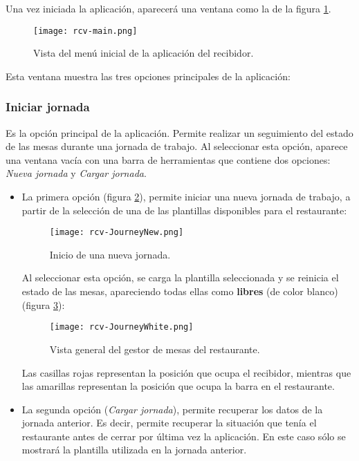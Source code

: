 Una vez iniciada la aplicación, aparecerá una ventana como la de la
figura \ref{fig:rcv-main}.

  \begin{figure}[ht]
    \begin{center}
      \texttt{[image: rcv-main.png]}
      \caption{Vista del menú inicial de la aplicación del recibidor.}
      \label{fig:rcv-main}
    \end{center}
  \end{figure}

Esta ventana muestra las tres opciones principales de la aplicación:

\subsubsection{Iniciar jornada}
Es la opción principal de la aplicación. Permite realizar un seguimiento del
estado de las mesas durante una jornada de trabajo. Al seleccionar esta
opción, aparece una ventana vacía con una barra de herramientas que contiene
dos opciones: \emph{Nueva jornada} y \emph{Cargar jornada}.

\begin{itemize}
\item La primera opción (figura \ref{fig:rcv-JourneyNew}), permite iniciar una
nueva jornada de trabajo, a partir de la selección de una de las plantillas
disponibles para el restaurante:

  \begin{figure}[h]
    \begin{center}
      \texttt{[image: rcv-JourneyNew.png]}
      \caption{Inicio de una nueva jornada.}
      \label{fig:rcv-JourneyNew}
    \end{center}
  \end{figure}

Al seleccionar esta opción, se carga la plantilla seleccionada y se reinicia
el estado de las mesas, apareciendo todas ellas como \textbf{libres} (de
color blanco) (figura \ref{fig:rcv-JourneyWhite}):

  \begin{figure}[ht]
    \begin{center}
      \texttt{[image: rcv-JourneyWhite.png]}
      \caption{Vista general del gestor de mesas del restaurante.}
      \label{fig:rcv-JourneyWhite}
    \end{center}
  \end{figure}

Las casillas rojas representan la posición que ocupa el recibidor, mientras
que las amarillas representan la posición que ocupa la barra en el restaurante.

\item La segunda opción (\emph{Cargar jornada}), permite recuperar los datos
de la jornada anterior. Es decir, permite recuperar la situación que tenía el
restaurante antes de cerrar por última vez la aplicación. En este caso sólo
se mostrará la plantilla utilizada en la jornada anterior.
\end{itemize}

